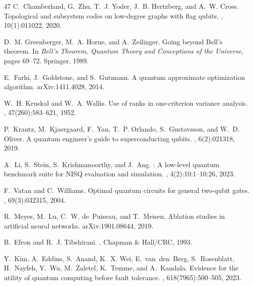 \documentclass[sigconf,nonacm]{acmart}
\begin{document}
\begin{thebibliography}{47}
C.~Chamberland, G.~Zhu, T.~J. Yoder, J.~B. Hertzberg, and A.~W. Cross.
\newblock Topological and subsystem codes on low-degree graphs with flag qubits.
, 10(1):011022, 2020.

D.~M. Greenberger, M.~A. Horne, and A.~Zeilinger.
\newblock Going beyond {B}ell's theorem.
\newblock In {\em Bell's Theorem, Quantum Theory and Conceptions of the Universe}, pages 69--72. Springer, 1989.

E.~Farhi, J.~Goldstone, and S.~Gutmann.
\newblock A quantum approximate optimization algorithm.
\newblock arXiv:1411.4028, 2014.

W.~H. Kruskal and W.~A. Wallis.
\newblock Use of ranks in one-criterion variance analysis.
, 47(260):583--621, 1952.

P.~Krantz, M.~Kjaergaard, F.~Yan, T.~P. Orlando, S.~Gustavsson, and W.~D. Oliver.
\newblock A quantum engineer's guide to superconducting qubits.
, 6(2):021318, 2019.

A.~Li, S.~Stein, S.~Krishnamoorthy, and J.~Ang.
: A low-level quantum benchmark suite for {NISQ} evaluation and simulation.
, 4(2):10:1--10:26, 2023.

F.~Vatan and C.~Williams.
\newblock Optimal quantum circuits for general two-qubit gates.
, 69(3):032315, 2004.

R.~Meyes, M.~Lu, C.~W. de~Puiseau, and T.~Meisen.
\newblock Ablation studies in artificial neural networks.
\newblock arXiv:1901.08644, 2019.

B.~Efron and R.~J. Tibshirani.
.
\newblock Chapman \& Hall/CRC, 1993.

Y.~Kim, A.~Eddins, S.~Anand, K.~X. Wei, E.~van~den~Berg, S.~Rosenblatt, H.~Nayfeh, Y.~Wu, M.~Zaletel, K.~Temme, and A.~Kandala.
\newblock Evidence for the utility of quantum computing before fault tolerance.
, 618(7965):500--505, 2023.

\end{thebibliography}
\end{document}
